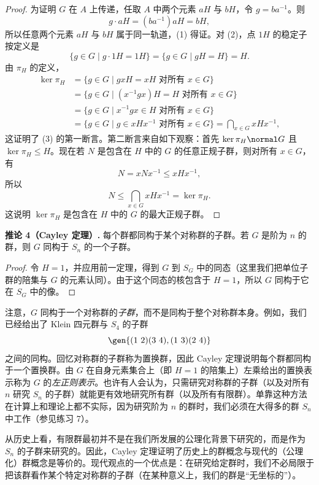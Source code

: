 \begin{proof}
为证明 $G$ 在 $A$ 上传递，任取 $A$ 中两个元素 $aH$ 与 $bH$，令 $g=ba^{-1}$。则
\[
  g\cdot aH=(ba^{-1})aH=bH,
\]
所以任意两个元素 $aH$ 与 $bH$ 属于同一轨道，(1) 得证。对 (2)，点 $1H$ 的稳定子按定义是
\[
  \{g\in G\mid g\cdot1H=1H\}=\{g\in G\mid gH=H\}=H.
\]
由 $\pi_H$ 的定义，
\begin{align*}
  \ker\pi_H
  &=\{g\in G\mid gxH=xH\text{ 对所有 }x\in G\}\\
  &=\{g\in G\mid (x^{-1}gx)H=H\text{ 对所有 }x\in G\}\\
  &=\{g\in G\mid x^{-1}gx\in H\text{ 对所有 }x\in G\}\\
  &=\{g\in G\mid g\in xHx^{-1}\text{ 对所有 }x\in G\}
    =\bigcap_{x\in G}xHx^{-1},
\end{align*}
这证明了 (3) 的第一断言。第二断言来自如下观察：首先 $\ker\pi_H\normal G$ 且 $\ker\pi_H\leq H$。现在若 $N$ 是包含在 $H$ 中的 $G$ 的任意正规子群，则对所有 $x\in G$，有
\[
  N=xNx^{-1}\leq xHx^{-1},
\]
所以
\[
  N\leq\bigcap_{x\in G}xHx^{-1}=\ker\pi_H.
\]
这说明 $\ker\pi_H$ 是包含在 $H$ 中的 $G$ 的最大正规子群。
\end{proof}

\medskip
\noindent\textbf{推论 4（Cayley 定理）.} 每个群都同构于某个对称群的子群。若 $G$ 是阶为 $n$ 的群，则 $G$ 同构于 $S_n$ 的一个子群。

\begin{proof}
令 $H=1$，并应用前一定理，得到 $G$ 到 $S_G$ 中的同态（这里我们把单位子群的陪集与 $G$ 的元素认同）。由于这个同态的核包含于 $H=1$，所以 $G$ 同构于它在 $S_G$ 中的像。
\end{proof}

注意，$G$ 同构于一个对称群的\emph{子群}，而不是同构于整个对称群本身。例如，我们已经给出了 Klein 四元群与 $S_4$ 的子群
\[
  \gen{(1\ 2)(3\ 4),(1\ 3)(2\ 4)}
\]
之间的同构。回忆对称群的子群称为置换群，因此 Cayley 定理说明每个群都同构于一个置换群。由 $G$ 在自身元素集合上（即 $H=1$ 的陪集上）左乘给出的置换表示称为 $G$ 的\emph{左正则表示}。也许有人会认为，只需研究对称群的子群（以及对所有 $n$ 研究 $S_n$ 的子群）就能更有效地研究所有群（以及所有有限群）。单靠这种方法在计算上和理论上都不实际，因为研究阶为 $n$ 的群时，我们必须在大得多的群 $S_n$ 中工作（参见练习 7）。

从历史上看，有限群最初并不是在我们所发展的公理化背景下研究的，而是作为 $S_n$ 的子群来研究的。因此，Cayley 定理证明了历史上的群概念与现代的（公理化）群概念是等价的。现代观点的一个优点是：在研究给定群时，我们不必局限于把该群看作某个特定对称群的子群（在某种意义上，我们的群是“无坐标的”）。

